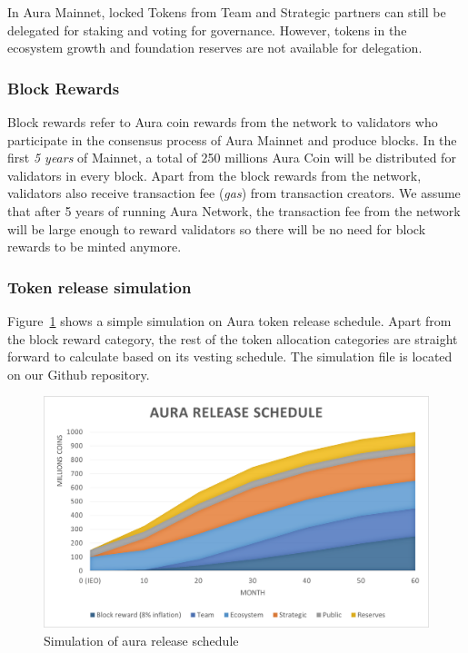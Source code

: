 \documentclass[12pt]{article}
\begin{document}
In Aura Mainnet, locked Tokens from Team and Strategic partners can still be delegated for staking and voting for governance. However, tokens in the ecosystem growth and foundation reserves are not available for delegation. 

\subsubsection{Block Rewards}
Block rewards refer to Aura coin rewards from the network to validators who participate in the consensus process of Aura Mainnet and produce blocks. In the first \emph{5 years} of Mainnet, a total of 250 millions Aura Coin will be distributed for validators in every block. Apart from the block rewards from the network, validators also receive transaction fee (\emph{gas}) from transaction creators. We assume that after 5 years of running Aura Network, the transaction fee from the network will be large enough to reward validators so there will be no need for block rewards to be minted anymore.

\subsubsection{Token release simulation}

Figure~\ref{fig:release} shows a simple simulation on Aura token release schedule. Apart from the block reward category, the rest of the token allocation categories are straight forward to calculate based on its vesting schedule. The simulation file is located on our Github repository.

\begin{figure}[ht]
\label{fig:release}
\includegraphics[width=\textwidth]{img/release.png}
\centering
\caption{Simulation of aura release schedule}
\end{figure}





\end{document}
